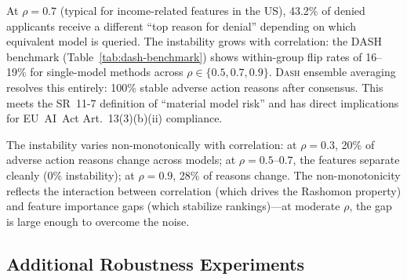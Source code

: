 \documentclass{jmlr}
\newcommand{\DASH}{\textsc{Dash}}
\begin{document}
At $\rho = 0.7$ (typical for income-related features in the US), 43.2\% of denied applicants receive a different ``top reason for denial'' depending on which equivalent model is queried. The instability grows with correlation: the DASH benchmark (Table~\ref{tab:dash-benchmark}) shows within-group flip rates of 16--19\% for single-model methods across $\rho \in \{0.5, 0.7, 0.9\}$. \DASH{} ensemble averaging resolves this entirely: 100\% stable adverse action reasons after consensus. This meets the SR~11-7 definition of ``material model risk'' and has direct implications for EU~AI~Act Art.~13(3)(b)(ii) compliance.

The instability varies non-monotonically with correlation: at $\rho = 0.3$, 20\% of adverse action reasons change across models; at $\rho = 0.5$--$0.7$, the features separate cleanly (0\% instability); at $\rho = 0.9$, 28\% of reasons change. The non-monotonicity reflects the interaction between correlation (which drives the Rashomon property) and feature importance gaps (which stabilize rankings)---at moderate $\rho$, the gap is large enough to overcome the noise.

\subsection{Additional Robustness Experiments}
\label{sec:robustness-experiments}
\end{document}
